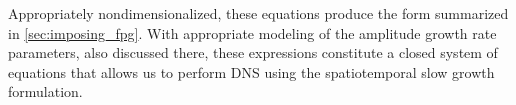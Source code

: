 {%


Appropriately nondimensionalized, these equations produce the form summarized in
\autoref{sec:imposing_fpg}.  With appropriate modeling of the amplitude growth
rate parameters, also discussed there, these expressions constitute a closed
system of equations that allows us to perform DNS using the spatiotemporal slow
growth formulation.

}
